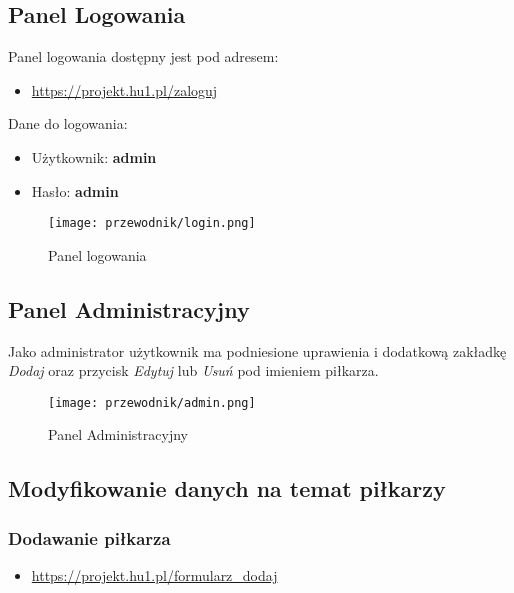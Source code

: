         \subsection{Panel Logowania}
            Panel logowania dostępny jest pod adresem:
            \begin{itemize}
                \item \url{https://projekt.hu1.pl/zaloguj}
            \end{itemize}

            Dane do logowania: 
            \begin{itemize}
                \item Użytkownik: \textbf{admin}
                \item Hasło: \textbf{admin}
            \end{itemize}

                \begin{figure}[!htb]
                    \centering
                    \texttt{[image: przewodnik/login.png]}
                    \caption{Panel logowania}                
                \end{figure}

        \pagebreak

        \subsection{Panel Administracyjny}
            Jako administrator użytkownik ma podniesione uprawienia i dodatkową zakładkę \textit{Dodaj} oraz przycisk \textit{Edytuj} lub \textit{Usuń} pod imieniem piłkarza.

            \begin{figure}[!htb]
                \centering
                \texttt{[image: przewodnik/admin.png]}
                \caption{Panel Administracyjny}                
            \end{figure}

        \subsection{Modyfikowanie danych na temat piłkarzy}

        \subsubsection{Dodawanie piłkarza}

                \begin{itemize}
                    \item \url{https://projekt.hu1.pl/formularz_dodaj}
                \end{itemize}
                
